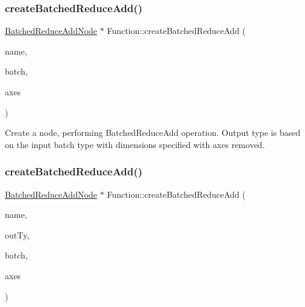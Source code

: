 \subsubsection{\texorpdfstring{create\+Batched\+Reduce\+Add()}{createBatchedReduceAdd()}\hspace{0.1cm}{\footnotesize\ttfamily [1/2]}}
{\footnotesize\ttfamily \hyperlink{classglow_1_1_batched_reduce_add_node}{Batched\+Reduce\+Add\+Node} $\ast$ Function\+::create\+Batched\+Reduce\+Add (\begin{DoxyParamCaption}\item[{llvm\+::\+String\+Ref}]{name,  }\item[{\hyperlink{structglow_1_1_node_value}{Node\+Value}}]{batch,  }\item[{llvm\+::\+Array\+Ref$<$ \hyperlink{namespaceglow_a0ca574644e1e42ef193a9947fb4d8911}{unsigned\+\_\+t} $>$}]{axes }\end{DoxyParamCaption})}

Create a node, performing Batched\+Reduce\+Add operation. Output type is based on the input {\ttfamily batch} type with dimensions specified with {\ttfamily axes} removed. \mbox{\label{classglow_1_1_function_ab00d007284518a222352b1a8083c892e}} 
\subsubsection{\texorpdfstring{create\+Batched\+Reduce\+Add()}{createBatchedReduceAdd()}\hspace{0.1cm}{\footnotesize\ttfamily [2/2]}}
{\footnotesize\ttfamily \hyperlink{classglow_1_1_batched_reduce_add_node}{Batched\+Reduce\+Add\+Node} $\ast$ Function\+::create\+Batched\+Reduce\+Add (\begin{DoxyParamCaption}\item[{llvm\+::\+String\+Ref}]{name,  }\item[{\hyperlink{structglow_1_1_type}{Type\+Ref}}]{out\+Ty,  }\item[{\hyperlink{structglow_1_1_node_value}{Node\+Value}}]{batch,  }\item[{llvm\+::\+Array\+Ref$<$ \hyperlink{namespaceglow_a0ca574644e1e42ef193a9947fb4d8911}{unsigned\+\_\+t} $>$}]{axes }\end{DoxyParamCaption})}

